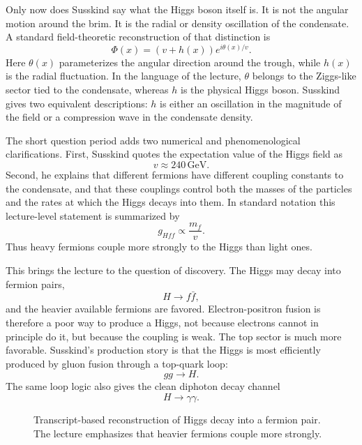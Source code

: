 Only now does Susskind say what the Higgs boson itself is. It is not the angular motion around the brim. It is the radial or density oscillation of the condensate. A standard field-theoretic reconstruction of that distinction is
\begin{equation}
\Phi(x)=(v+h(x))e^{i\theta(x)/v}.
\end{equation}
Here \(\theta(x)\) parameterizes the angular direction around the trough, while \(h(x)\) is the radial fluctuation. In the language of the lecture, \(\theta\) belongs to the Ziggs-like sector tied to the condensate, whereas \(h\) is the physical Higgs boson. Susskind gives two equivalent descriptions: \(h\) is either an oscillation in the magnitude of the field or a compression wave in the condensate density.

The short question period adds two numerical and phenomenological clarifications. First, Susskind quotes the expectation value of the Higgs field as
\begin{equation}
v\approx 240\,\mathrm{GeV}.
\end{equation}
Second, he explains that different fermions have different coupling constants to the condensate, and that these couplings control both the masses of the particles and the rates at which the Higgs decays into them. In standard notation this lecture-level statement is summarized by
\begin{equation}
g_{Hff}\propto \frac{m_{f}}{v}.
\end{equation}
Thus heavy fermions couple more strongly to the Higgs than light ones.

This brings the lecture to the question of discovery. The Higgs may decay into fermion pairs,
\begin{equation}
H\to f\bar f,
\end{equation}
and the heavier available fermions are favored. Electron-positron fusion is therefore a poor way to produce a Higgs, not because electrons cannot in principle do it, but because the coupling is weak. The top sector is much more favorable. Susskind's production story is that the Higgs is most efficiently produced by gluon fusion through a top-quark loop:
\begin{equation}
gg\to H.
\end{equation}
The same loop logic also gives the clean diphoton decay channel
\begin{equation}
H\to \gamma\gamma.
\end{equation}

\begin{figure}
\centering
{}
\caption{Transcript-based reconstruction of Higgs decay into a fermion pair. The lecture emphasizes that heavier fermions couple more strongly.}
\end{figure}

